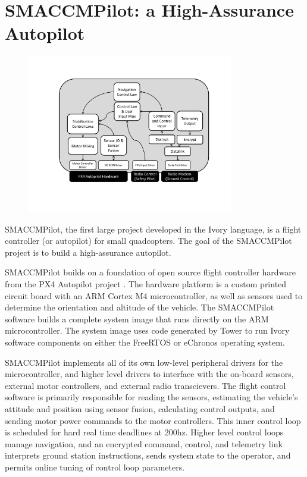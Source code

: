 \section{SMACCMPilot: a High-Assurance Autopilot}

\begin{figure}
\includegraphics[width=9cm]{figures/smaccmpilot-diagram-jan14}
\end{figure}

SMACCMPilot, the first large project developed in the Ivory language, is a
flight controller (or autopilot) for small quadcopters. The goal of the
SMACCMPilot project is to build a high-assurance autopilot.

SMACCMPilot builds on a foundation of open source flight controller hardware
from the PX4 Autopilot project . The hardware platform is a
custom printed circuit board with an ARM Cortex M4 microcontroller, as well as
sensors used to determine the orientation and altitude of the vehicle.
 The
SMACCMPilot software builds a complete system image that runs directly on the
ARM microcontroller. The system image uses code generated by Tower to run Ivory
software components on either the FreeRTOS or eChronos operating system.

SMACCMPilot implements all of its own low-level peripheral drivers for the
microcontroller, and higher level drivers to interface with the on-board
sensors, external motor controllers, and external radio transcievers. The flight
control software is primarily responsible for reading the sensors, estimating
the vehicle's attitude and position using sensor fusion, calculating control
outputs, and sending motor power commands to the motor controllers. This inner
control loop is scheduled for hard real time deadlines at 200hz. Higher level
control loops manage navigation, and an encrypted command, control, and
telemetry link interprets ground station instructions, sends system state to
the operator, and permits online tuning of control loop parameters.

